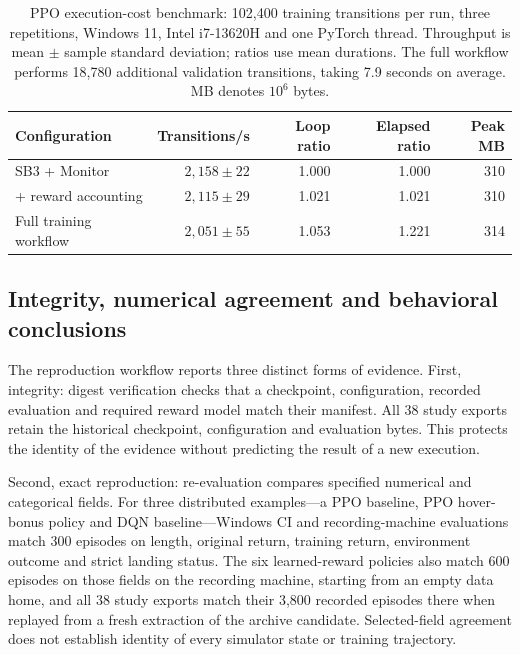 \documentclass[preprint,12pt]{elsarticle}
\begin{document}
\begin{table}[!tbp]
\caption{PPO execution-cost benchmark: 102,400 training transitions per run, three repetitions, Windows 11, Intel i7-13620H and one PyTorch thread. Throughput is mean $\pm$ sample standard deviation; ratios use mean durations. The full workflow performs 18,780 additional validation transitions, taking 7.9 seconds on average. MB denotes $10^6$ bytes.}
\label{tab:cost}
\centering\small
\begin{tabular}{@{}lrrrr@{}}
\toprule
Configuration & Transitions/s & Loop ratio & Elapsed ratio & Peak MB \\
\midrule
SB3 + Monitor & $2{,}158\pm22$ & 1.000 & 1.000 & 310 \\
+ reward accounting & $2{,}115\pm29$ & 1.021 & 1.021 & 310 \\
Full training workflow & $2{,}051\pm55$ & 1.053 & 1.221 & 314 \\
\bottomrule
\end{tabular}
\end{table}

\subsection{Integrity, numerical agreement and behavioral conclusions}\label{sec:integrity}
The reproduction workflow reports three distinct forms of evidence. First, integrity: digest verification checks that a checkpoint, configuration, recorded evaluation and required reward model match their manifest. All 38 study exports retain the historical checkpoint, configuration and evaluation bytes. This protects the identity of the evidence without predicting the result of a new execution.

Second, exact reproduction: re-evaluation compares specified numerical and categorical fields. For three distributed examples---a PPO baseline, PPO hover-bonus policy and DQN baseline---Windows CI and recording-machine evaluations match 300 episodes on length, original return, training return, environment outcome and strict landing status. The six learned-reward policies also match 600 episodes on those fields on the recording machine, starting from an empty data home, and all 38 study exports match their 3,800 recorded episodes there when replayed from a fresh extraction of the archive candidate. Selected-field agreement does not establish identity of every simulator state or training trajectory.
\end{document}
